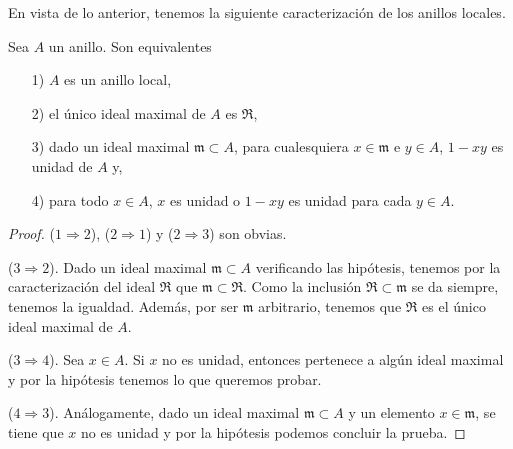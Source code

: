 \documentclass[./main.tex]{subfiles}
\begin{document}
	En vista de lo anterior, tenemos la siguiente caracterización de los anillos locales.
	\begin{proposition}
		Sea $A$ un anillo. Son equivalentes
		\begin{itemize}
			\item[1)] $A$ es un anillo local,
			\item[2)] el único ideal maximal de $A$ es $\mathfrak R$,
			\item[3)] dado un ideal maximal $\mathfrak m\subset A$, para cualesquiera $x\in\mathfrak m$ e $y\in A$, $1-xy$ es unidad de $A$ y,
			\item[4)] para todo $x\in A$, $x$ es unidad o $1-xy$ es unidad para cada $y\in A$.
		\end{itemize}
	\end{proposition}
	\begin{proof}
		
		
		($1\Rightarrow2$), ($2\Rightarrow1$) y ($2\Rightarrow 3$) son obvias.
		
		($3\Rightarrow2$). Dado un ideal maximal $\mathfrak m\subset A$ verificando las hipótesis, tenemos por la caracterización del ideal $\mathfrak R$ que $\mathfrak m\subset \mathfrak R$. Como la inclusión $\mathfrak R\subset \mathfrak m$ se da siempre, tenemos la igualdad. Además, por ser $\mathfrak m$ arbitrario, tenemos que $\mathfrak R$ es el único ideal maximal de $A$.
		
		($3\Rightarrow 4$). Sea $x\in A$. Si $x$ no es unidad, entonces pertenece a algún ideal maximal y por la hipótesis tenemos lo que queremos probar.
		
		($4\Rightarrow 3$). Análogamente, dado un ideal maximal $\mathfrak m\subset A$ y un elemento $x\in\mathfrak m$, se tiene que $x$ no es unidad y por la hipótesis podemos concluir la prueba.
		
	\end{proof}
	
\end{document}
